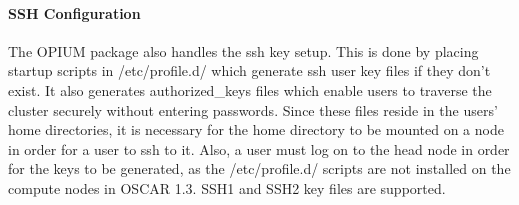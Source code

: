 \paragraph{SSH Configuration}
The OPIUM package also handles the ssh key setup.  This is done by placing
startup scripts in /etc/profile.d/ which generate ssh user key files if 
they don't exist.  It also generates authorized_keys files which enable
users to traverse the cluster securely without entering passwords.  Since
these files reside in the users' home directories, it is necessary for
the home directory to be mounted on a node in order for a user to ssh to
it.  Also, a user must log on to the head node in order for the keys to
be generated, as the /etc/profile.d/ scripts are not installed on the
compute nodes in OSCAR 1.3.  SSH1 and SSH2 key files are supported.  

